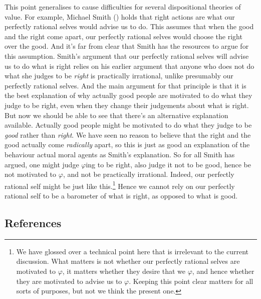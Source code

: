 \documentclass[
  10pt,
  letterpaper,
  DIV=11,
  numbers=noendperiod,
  twoside]{scrartcl}
\begin{document}
This point generalises to cause difficulties for several dispositional
theories of value. For example, Michael Smith
() holds that right actions are what our
perfectly rational selves would advise us to do. This assumes that when
the good and the right come apart, our perfectly rational selves would
choose the right over the good. And it's far from clear that Smith has
the resources to argue for this assumption. Smith's argument that our
perfectly rational selves will advise us to do what is right relies on
his earlier argument that anyone who does not do what she judges to be
\emph{right} is practically irrational, unlike presumably our perfectly
rational selves. And the main argument for that principle is that it is
the best explanation of why actually good people are motivated to do
what they judge to be right, even when they change their judgements
about what is right. But now we should be able to see that there's an
alternative explanation available. Actually good people might be
motivated to do what they judge to be \emph{good} rather than
\emph{right}. We have seen no reason to believe that the right and the
good actually come \emph{radically} apart, so this is just as good an
explanation of the behaviour actual moral agents as Smith's explanation.
So for all Smith has argued, one might judge \(\varphi\)ing to be right,
also judge it not to be good, hence be not motivated to \(\varphi\), and
not be practically irrational. Indeed, our perfectly rational self might
be just like this.\footnote{We have glossed over a technical point here
  that is irrelevant to the current discussion. What matters is not
  whether our perfectly rational selves are motivated to \(\varphi\), it
  matters whether they desire that we \(\varphi\), and hence whether
  they are motivated to advise us to \(\varphi\). Keeping this point
  clear matters for all sorts of purposes, but not we think the present
  one.} Hence we cannot rely on our perfectly rational self to be a
barometer of what is right, as opposed to what is good.

\subsection*{References}\label{references}
\end{document}
